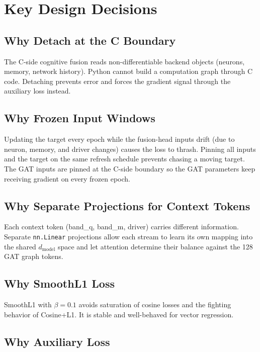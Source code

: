\documentclass[12pt]{article}
\begin{document}
\section{Key Design Decisions}

\subsection{Why Detach at the C Boundary}

The C-side cognitive fusion reads non-differentiable backend objects
(neurons, memory, network history). Python cannot build a computation
graph through C code. Detaching prevents error and forces the gradient
signal through the auxiliary loss instead.

\subsection{Why Frozen Input Windows}

Updating the target every epoch while the fusion-head inputs drift (due to
neuron, memory, and driver changes) causes the loss to thrash. Pinning all
inputs and the target on the same refresh schedule prevents chasing a
moving target. The GAT inputs are pinned at the C-side boundary so the
GAT parameters keep receiving gradient on every frozen epoch.

\subsection{Why Separate Projections for Context Tokens}

Each context token (band\_q, band\_m, driver) carries different
information. Separate \texttt{nn.Linear} projections allow each stream to
learn its own mapping into the shared $d_{\text{model}}$ space and let
attention determine their balance against the 128 GAT graph tokens.

\subsection{Why SmoothL1 Loss}

SmoothL1 with $\beta = 0.1$ avoids saturation of cosine losses and the
fighting behavior of Cosine+L1. It is stable and well-behaved for
vector regression.

\subsection{Why Auxiliary Loss}
\end{document}
